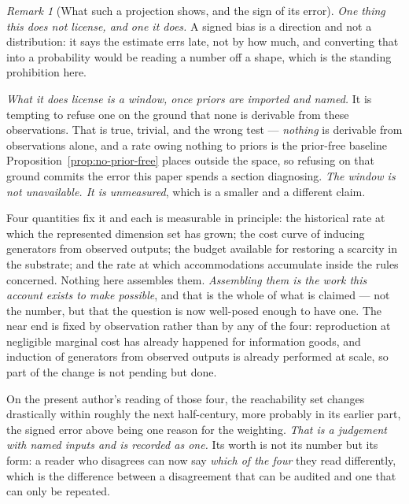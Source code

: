 \documentclass[11pt,a4paper]{article}
\theoremstyle{remark}
\newtheorem{remark}[definition]{Remark}
\begin{document}
\begin{remark}[What such a projection shows, and the sign of its error]
\emph{One thing this does not license, and one it does.} A signed bias is a direction and not a
distribution: it says the estimate errs late, not by how much, and converting that into a probability
would be reading a number off a shape, which is the standing prohibition here.

\emph{What it does license is a window, once priors are imported and named.} It is tempting to refuse
one on the ground that none is derivable from these observations. That is true, trivial, and the wrong
test --- \emph{nothing} is derivable from observations alone, and a rate owing nothing to priors is the
prior-free baseline Proposition~\ref{prop:no-prior-free} places outside the space, so refusing on that
ground commits the error this paper spends a section diagnosing. \emph{The window is not unavailable.
It is unmeasured}, which is a smaller and a different claim.

Four quantities fix it and each is measurable in principle: the historical rate at which the
represented dimension set has grown; the cost curve of inducing generators from observed outputs; the
budget available for restoring a scarcity in the substrate; and the rate at which accommodations
accumulate inside the rules concerned. Nothing here assembles them. \emph{Assembling them is the work
this account exists to make possible}, and that is the whole of what is claimed --- not the number, but
that the question is now well-posed enough to have one. The near end is fixed by observation rather
than by any of the four: reproduction at negligible marginal cost has already happened for information
goods, and induction of generators from observed outputs is already performed at scale, so part of the
change is not pending but done.

On the present author's reading of those four, the reachability set changes drastically within roughly
the next half-century, more probably in its earlier part, the signed error above being one reason for
the weighting. \emph{That is a judgement with named inputs and is recorded as one.} Its worth is not
its number but its form: a reader who disagrees can now say \emph{which of the four} they read
differently, which is the difference between a disagreement that can be audited and one that can only
be repeated.
\end{remark}
\end{document}
